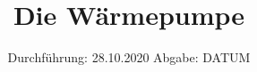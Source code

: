 

\subject{VERSUCH D206}
\title{Die Wärmepumpe}
\date{%
  Durchführung: 28.10.2020
  \hspace{3em}
  Abgabe: DATUM
}



\maketitle
\thispagestyle{empty}
\tableofcontents
\newpage






\printbibliography{}


